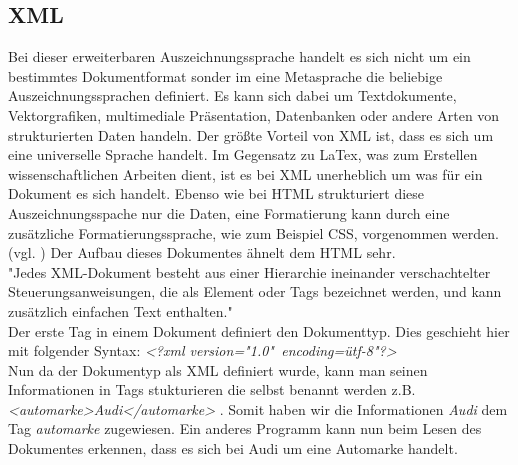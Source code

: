 \subsection{XML}
Bei dieser erweiterbaren Auszeichnungssprache handelt es sich nicht um ein bestimmtes Dokumentformat sonder im eine Metasprache die beliebige Auszeichnungssprachen definiert. Es kann sich dabei um Textdokumente, Vektorgrafiken, multimediale Präsentation, Datenbanken oder andere Arten von strukturierten Daten handeln. Der größte Vorteil von \ac{XML} ist, dass es sich um eine universelle Sprache handelt. Im Gegensatz zu LaTex, was zum Erstellen wissenschaftlichen Arbeiten dient, ist es bei \ac{XML} unerheblich um was für ein Dokument es sich handelt. Ebenso wie bei \ac{HTML} strukturiert diese Auszeichnungsspache nur die Daten, eine Formatierung kann durch eine zusätzliche Formatierungssprache, wie zum Beispiel \ac{CSS}, vorgenommen werden. (vgl. \cite{SK2008, S.769/S.770}) Der Aufbau dieses Dokumentes ähnelt dem \ac{HTML} sehr. \\ "Jedes XML-Dokument besteht aus einer Hierarchie ineinander verschachtelter Steuerungsanweisungen, die als Element oder Tags bezeichnet werden, und kann zusätzlich einfachen Text enthalten." \cite{SK2008, S.771} \\
Der erste Tag in einem Dokument definiert den Dokumenttyp. Dies geschieht hier mit folgender Syntax: \textit{<?xml version="1.0" \,encoding=\"utf-8"?>} \\
Nun da der Dokumentyp als XML definiert wurde, kann man seinen Informationen in Tags stukturieren die selbst benannt werden z.B. \textit{<automarke>Audi</automarke>} . Somit haben wir die Informationen \textit{Audi} dem Tag \textit{automarke} zugewiesen. Ein anderes Programm kann nun beim Lesen des Dokumentes erkennen, dass es sich bei Audi um eine Automarke handelt.

